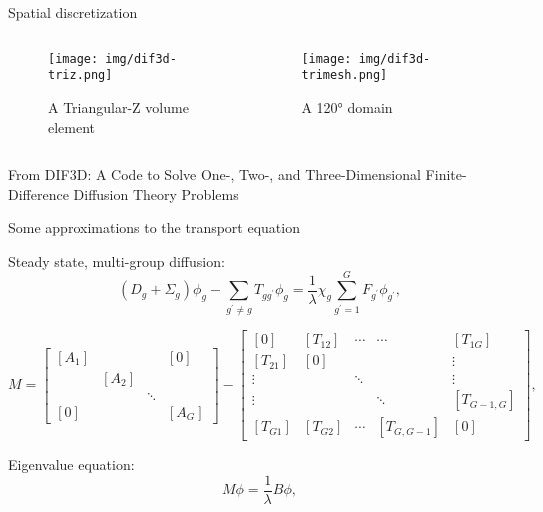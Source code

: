 \documentclass[pdf,aspectratio=169]{beamer}
\begin{document}
\begin{frame}{Spatial discretization}
\begin{columns}
    \begin{column}{0.5\textwidth}
        \begin{figure}[ht]
        \centering
        \texttt{[image: img/dif3d-triz.png]}
        \caption{\small A Triangular-Z volume element}
        \end{figure}
    \end{column}
    \begin{column}{0.5\textwidth}
        \begin{figure}[ht]
        \centering
        \texttt{[image: img/dif3d-trimesh.png]}
        \caption{\small A 120° domain}
        \end{figure}
    \end{column}
\end{columns}
    \centering \tiny From DIF3D: A Code to Solve One-, Two-, and Three-Dimensional
    Finite-Difference Diffusion Theory Problems
\end{frame}

\begin{frame}{Some approximations to the transport equation}

Steady state, multi-group diffusion:
\begin{equation}
\left(D_{g}+\Sigma_{g}\right)\phi_{g}-\sum_{g^{\prime}\ne g}T_{gg^{\prime}}\phi_{g}=\frac{1}{\lambda}\chi_{g}\sum_{g^{\prime}=1}^{G}F_{g^{\prime}}\phi_{g^{\prime}},\label{eq:group-balance-orig}
\end{equation}


\begin{equation}
M=\left[\begin{array}{cccc}
\left[A_{1}\right] &  &  & \left[0\right]\\
 & \left[A_{2}\right]\\
 &  & \ddots\\
\left[0\right] &  &  & \left[A_{G}\right]
\end{array}\right]-\left[\begin{array}{ccccc}
[0] & \left[T_{12}\right] & \cdots & \cdots & \left[T_{1G}\right]\\
\left[T_{21}\right] & [0] &  &  & \vdots\\
\vdots &  & \ddots &  & \vdots\\
\vdots &  &  & \ddots & \left[T_{G-1,G}\right]\\
\left[T_{G1}\right] & \left[T_{G2}\right] & \cdots & \left[T_{G,G-1}\right] & [0]
\end{array}\right],
\end{equation}

Eigenvalue equation:
\begin{equation}
M\phi=\frac{1}{\lambda}B\phi,\label{eq:generalizedEigenproblem}
\end{equation}

\end{frame}
\end{document}
